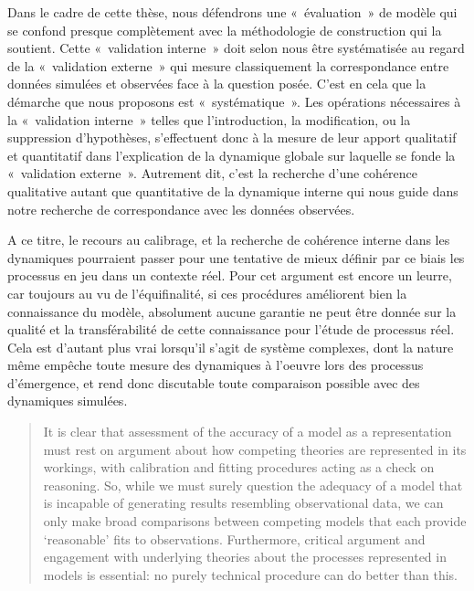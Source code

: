 Dans le cadre de cette thèse, nous défendrons une « évaluation » de modèle qui se confond presque complètement avec la méthodologie de construction qui la soutient. Cette « validation interne » doit selon nous être systématisée au regard de la « validation externe » qui mesure classiquement la correspondance entre données simulées et observées face à la question posée. C’est en cela que la démarche que nous proposons est « systématique ». Les opérations nécessaires à la « validation interne » telles que l'introduction, la modification, ou la suppression d'hypothèses, s’effectuent donc à la mesure de leur apport qualitatif et quantitatif dans l'explication de la dynamique globale sur laquelle se fonde la « validation externe ». Autrement dit, c'est la recherche d'une cohérence qualitative autant que quantitative de la dynamique interne qui nous guide dans notre recherche de correspondance avec les données observées.

A ce titre, le recours au calibrage, et la recherche de cohérence interne dans les dynamiques pourraient passer pour une tentative de mieux définir par ce biais les processus en jeu dans un contexte réel. Pour \autocite{OSullivan2004} cet argument est encore un leurre, car toujours au vu de l'équifinalité, si ces procédures améliorent bien la connaissance du modèle, absolument aucune garantie ne peut être donnée sur la qualité et la transférabilité de cette connaissance pour l'étude de processus réel. Cela est d'autant plus vrai lorsqu'il s'agit de système complexes, dont la nature même empêche toute  mesure des dynamiques à l'oeuvre lors des processus d'émergence, et rend donc discutable toute comparaison possible avec des dynamiques simulées. 

\begin{quotation} It is clear that assessment of the accuracy of a model as a representation must rest on argument about how competing theories are represented in its workings, with calibration and fitting procedures acting as a check on reasoning. So, while we must surely question the adequacy of a model that is incapable of generating results resembling observational data, we can only make broad comparisons between competing models that each provide ‘reasonable’ fits to observations. Furthermore, critical argument and engagement with underlying theories about the processes represented in models is essential: no purely technical procedure can do better than this.  \\  \end{quotation}

